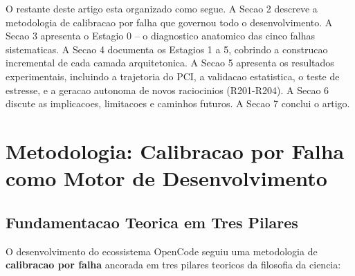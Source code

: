 \documentclass[5p]{elsarticle}
\begin{document}
O restante deste artigo esta organizado como segue. A Secao 2 descreve a metodologia
de calibracao por falha que governou todo o desenvolvimento. A Secao 3 apresenta
o Estagio 0 -- o diagnostico anatomico das cinco falhas sistematicas. A Secao 4
documenta os Estagios 1 a 5, cobrindo a construcao incremental de cada camada
arquitetonica. A Secao 5 apresenta os resultados experimentais, incluindo a
trajetoria do PCI, a validacao estatistica, o teste de estresse, e a geracao
autonoma de novos raciocinios (R201-R204). A Secao 6 discute as implicacoes,
limitacoes e caminhos futuros. A Secao 7 conclui o artigo.

\section{Metodologia: Calibracao por Falha como Motor de Desenvolvimento}

\subsection{Fundamentacao Teorica em Tres Pilares}

O desenvolvimento do ecossistema OpenCode seguiu uma metodologia de
\textbf{calibracao por falha} ancorada em tres pilares teoricos da filosofia
da ciencia:
\end{document}

